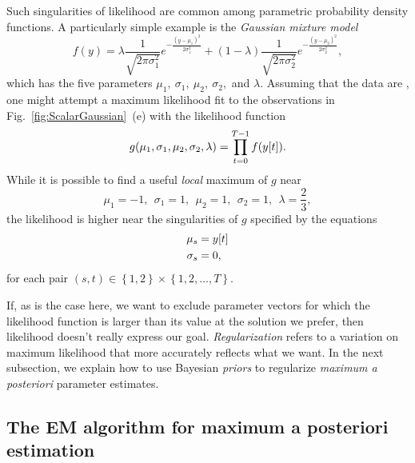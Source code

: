 Such singularities of likelihood are common among parametric
probability density functions.  A particularly simple example is the
\emph{Gaussian mixture model}
\begin{equation}
  \label{eq:GaussianMixture}
  f(y) = \lambda \frac{1}{\sqrt{2 \pi \sigma_1^2}}
  e^{-\frac{(y-\mu_1)^2}{2 \sigma_1^2}} + (1-\lambda) \frac{1}{\sqrt{2 \pi \sigma_2^2}}
  e^{-\frac{(y-\mu_2)^2}{2 \sigma_2^2}},
\end{equation}
which has the five parameters $\mu_1,~\sigma_1,~\mu_2,~\sigma_2,$ and $\lambda$.
Assuming that the data are \iid, one might attempt a maximum
likelihood fit to the observations in
Fig.~\ref{fig:ScalarGaussian}~(e) with the likelihood function
\begin{equation}
  \label{eq:GMLike}
  g(\mu_1,\sigma_1,\mu_2,\sigma_2,\lambda) = \prod_{t=0}^{T-1} f({y}{[t]}).
\end{equation}
While it is possible to find a useful \emph{local} maximum of $g$
near
\begin{equation*}
  \mu_1 = -1,~~\sigma_1 = 1,~~ \mu_2 = 1,~~ \sigma_2 = 1,~~ \lambda =
  \frac{2}{3},
\end{equation*}
the likelihood is higher near the singularities of $g$ specified by
the equations
\begin{align*}
  \mu_s &= {y}{[t]}\\
  \sigma_s &= 0,
\end{align*}
for each pair $(s,t)\in \left\{1,2\right\} \times \left\{ 1,2,\ldots,T
\right\}$.

If, as is the case here, we want to exclude parameter vectors for
which the likelihood function is larger than its value at the solution
we prefer, then likelihood doesn't really express our goal.
\emph{Regularization} refers to a variation on maximum likelihood
that more accurately reflects what we want.  In the next subsection,
we explain how to use Bayesian \emph{priors} to regularize
\emph{maximum a posteriori} parameter estimates.

\subsection{The EM algorithm for maximum a posteriori estimation}
\label{sec:EMMAP}

